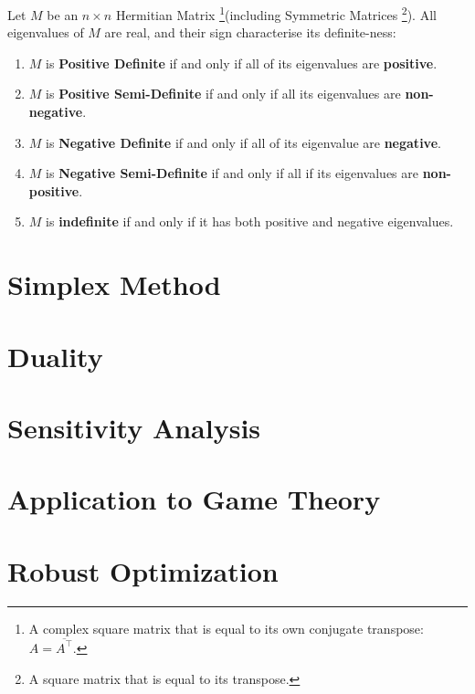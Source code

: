 \documentclass{article}
\begin{document}
\begin{definition}

    Let $M$ be an $n \times n$ Hermitian Matrix \footnote{A complex square matrix that is equal to its own conjugate transpose: $A = \overline{A^{\top}}.$}(including Symmetric Matrices \footnote{A square matrix that is equal to its transpose.}). All eigenvalues of $M$ are real, and their sign characterise its definite-ness:

    \begin{enumerate}
        \item $M$ is \textbf{Positive Definite} if and only if all of its eigenvalues are \textbf{positive}.
        \item $M$ is \textbf{Positive Semi-Definite} if and only if all its eigenvalues are \textbf{non-negative}. 
        \item $M$ is \textbf{Negative Definite} if and only if all of its eigenvalue are \textbf{negative}.
        \item $M$ is \textbf{Negative Semi-Definite} if and only if all if its eigenvalues are \textbf{non-positive}. 
        \item $M$ is \textbf{indefinite} if and only if it has both positive and negative eigenvalues.
    \end{enumerate}

\end{definition}


\section{Simplex Method}


\section{Duality}

\section{Sensitivity Analysis}

\section{Application to Game Theory}

\section{Robust Optimization}
\end{document}

